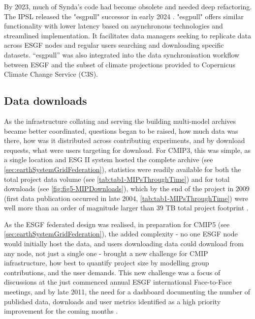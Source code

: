 \documentclass[manuscript]{copernicus}
\def\cred#1{{\color{red}#1}}
\begin{document}
By 2023, much of Synda’s code had become obsolete and needed deep refactoring. The IPSL released the "esgpull" successor in early 2024 \citep{rodriguez_esgf_2024}. "esgpull" offers similar functionality with lower latency based on asynchronous technologies and streamlined implementation. It facilitates data managers seeking to replicate data across ESGF nodes and regular users searching and downloading specific datasets. “esgpull” was also integrated into the data synchronisation workflow between ESGF and the subset of climate projections provided to Copernicus Climate Change Service (C3S).


\subsection{Data downloads}
\label{sec:CMIPDataDownloads}

As the infrastructure collating and serving the building multi-model archives became better coordinated, questions began to be raised, how much data was there, how was it distributed across contributing experiments, and by download requests, what were users targeting for download. For CMIP3, this was simple, as a single location and ESG II system hosted the complete archive (see \autoref{sec:earthSystemGridFederation}), statistics were readily available for both the total project data volume (see \autoref{tab:tab1-MIPsThroughTime}) and for total downloads (see \autoref{fig:fig5-MIPDownloads}), which by the end of the project in 2009 (first data publication occurred in late 2004, \autoref{tab:tab1-MIPsThroughTime}) were well more than an order of magnitude larger than 39 TB total project footprint \citep[470 TB;][]{ananthakrishnan_building_2007,williams_earth_2009}.

As the ESGF federated design was realised, in preparation for CMIP5 (see \autoref{sec:earthSystemGridFederation}), the added complexity - no one ESGF node would initially host the data, and users downloading data could download from any node, not just a single one - brought a new challenge for CMIP infrastructure, how best to quantify project size by modelling group contributions, and the user demands. This new challenge was a focus of discussions at the just commenced annual ESGF international Face-to-Face meetings, and by late 2011, the need for a dashboard documenting the number of published data, downloads and user metrics identified as a high priority improvement for the coming months \citep{williams_doe_2011}.
\end{document}
